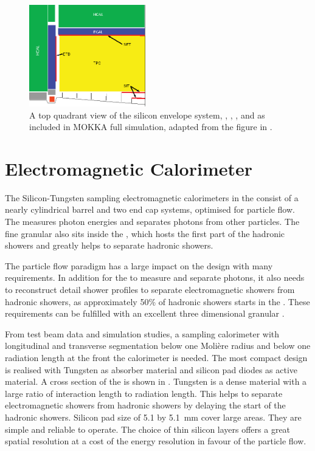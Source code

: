 \begin{figure}[tdbph]
\centering
\includegraphics[width=0.45\textwidth]{ILD/Tracking}
\caption[]
{A top quadrant view of the \ILD silicon envelope system, \SIT, \SET, \FTD, and \ETD as included in MOKKA full simulation, adapted from the figure in \cite{Baer:2013cma}.}
\label{fig:detectorTracking}
\end{figure}


\section{Electromagnetic Calorimeter}

The Silicon-Tungsten sampling electromagnetic calorimeters in the \ILD consist of a nearly cylindrical barrel and two end cap systems, optimised for particle flow. The \ECAL measures photon energies and separates photons from other particles. The fine granular \ECAL also sits inside the \HCAL, which hosts the first part of the hadronic showers and greatly helps to separate hadronic showers. 

The particle flow paradigm has a large impact on the \ECAL design with many requirements. In addition for the \ECAL to measure and separate photons, it also needs to reconstruct detail shower profiles to separate electromagnetic showers from hadronic showers, as approximately 50\% of hadronic showers starts in the \ECAL. These requirements can be fulfilled with an excellent three dimensional granular \ECAL.

From test beam data and simulation studies, a sampling calorimeter with longitudinal and transverse segmentation below one Moli\`{e}re radius and below one radiation length at the front the calorimeter is needed. The most compact design is realised with Tungsten as absorber material and silicon pad diodes as active material. A cross section of the \ECAL is shown in . Tungsten is a dense material with a large ratio of interaction length to radiation length. This helps to separate electromagnetic showers from hadronic showers by delaying the start of the hadronic showers. Silicon pad size of 5.1 by 5.1 \,mm cover large areas. They are simple and reliable to operate. The choice of thin silicon layers offers a great spatial resolution at a cost of the energy resolution in favour of the particle flow.

